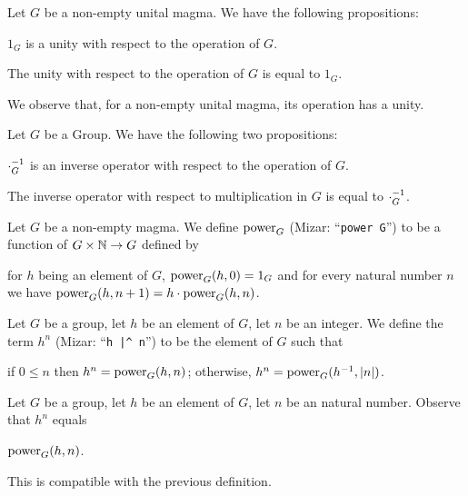 \documentclass{article}
\begin{document}
Let $G$ be a non-empty unital magma. We have the following propositions:
\begin{thm}
\item\label{group1:21} $1_{G}$ is a unity with respect to the operation
  of $G$.
\item\label{group1:22} The unity with respect to the operation of $G$ is
  equal to $1_{G}$.
\end{thm}

We observe that, for a non-empty unital magma, its operation has a
unity.

Let $G$ be a Group. We have the following two propositions:
\begin{thm}
\item\label{group1:23} $\cdot_{G}^{-1}$ is an inverse operator with
  respect to the operation of $G$.
\item\label{group1:24} The inverse operator with respect to
  multiplication in $G$ is equal to $\cdot_{G}^{-1}$.
\end{thm}

\begin{definition}
Let $G$ be a non-empty magma. We define $\operatorname{power}_{G}$ (Mizar:
``\verb#power G#'') to be a function of
$G\times\mathbb{N}\to G$ defined by
\begin{defn}
\item for $h$ being an element of $G$, $\operatorname{power}_{G}(h,0)=1_{G}$ and for
  every natural number $n$ we have $\operatorname{power}_{G}(h,n+1)=h\cdot\operatorname{power}_{G}(h,n)$.
\end{defn}
\end{definition}

\begin{definition}
Let $G$ be a group, let $h$ be an element of $G$, let $n$ be an integer.
We define the term $h^{n}$ (Mizar: ``\verb#h |^ n#'') to be the element
of $G$ such that
\begin{defn}
\item if $0\leq n$ then $h^{n}=\operatorname{power}_{G}(h,n)$; otherwise, $h^{n}=\operatorname{power}_{G}(h^{-1},|n|)$.
\end{defn}
\end{definition}

\begin{definition}
Let $G$ be a group, let $h$ be an element of $G$, let $n$ be an natural
number. Observe that $h^{n}$ equals
\begin{defn}
\item $\operatorname{power}_{G}(h,n)$.
\end{defn}
This is compatible with the previous definition.
\end{definition}
\end{document}
